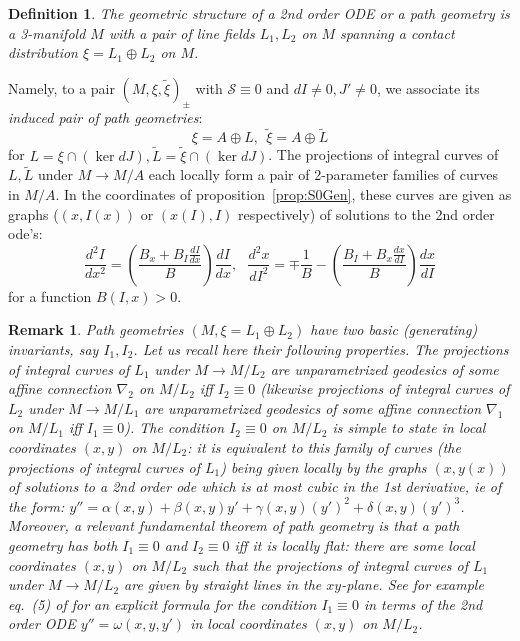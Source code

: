 \documentclass[10pt]{amsart}
\theoremstyle{definition}
\newtheorem{dfn}{Definition}
\newtheorem{rem}{Remark}
\begin{document}
   \begin{dfn}
       {\em The geometric structure of a 2nd order ODE or a {\em path geometry} is a 3-manifold $M$ with a pair of line fields $L_1, L_2$ on $M$ spanning a contact distribution $\xi = L_1\oplus L_2$ on $M$.}
   \end{dfn}


   Namely, to a pair $(M, \xi, \tilde \xi)_\pm$ with $\mathcal{S} \equiv 0$ and $dI\ne 0, J'\ne 0$, we associate its {\em induced pair of path geometries}:
   \[ \xi = A\oplus L, ~~\tilde \xi = A\oplus \tilde L \]
   for $L = \xi \cap (\ker dJ), \tilde L = \tilde \xi\cap (\ker dJ)$. The projections of integral curves of $L, \tilde L$ under $M\to M/A$ each locally form a pair of 2-parameter families of curves in $M/A$. In the coordinates of proposition~\ref{prop:S0Gen}, these curves are given as graphs ($(x, I(x))$ or $(x(I), I)$ respectively) of solutions to the 2nd order ode's:
   \begin{equation}\label{eq:PG1}
       \frac{d^2I}{dx^2} = \left(\frac{B_x + B_I\frac{dI}{dx}}{B}\right) \frac{dI}{dx}, ~~~\frac{d^2x}{dI^2} = \mp \frac{1}{B} - \left(\frac{B_I + B_x \frac{dx}{dI}}{B}\right) \frac{dx}{dI}
   \end{equation}
   for a function $B(I, x) > 0$.
   
   \begin{rem}
       {\em Path geometries $(M, \xi = L_1\oplus L_2)$ have two basic (generating) invariants, say $I_1, I_2$. Let us recall here their following properties. The projections of integral curves of $L_1$ under $M\to M/L_2$ are unparametrized geodesics of some affine connection $\nabla_2$ on $M/L_2$ iff $I_2\equiv 0$ (likewise projections of integral curves of $L_2$ under $M\to M/L_1$ are unparametrized geodesics of some affine connection $\nabla_1$ on $M/L_1$ iff $I_1\equiv 0$). The condition $I_2\equiv 0$ on $M/L_2$ is simple to state in local coordinates $(x,y)$ on $M/L_2$: it is equivalent to this family of curves (the projections of integral curves of $L_1$) being given locally by the graphs $(x, y(x))$ of solutions to a 2nd order ode which is at most {\em cubic} in the 1st derivative, ie of the form: $y'' = \alpha(x,y) + \beta(x,y) y' + \gamma(x,y)(y')^2 + \delta(x,y)(y')^3$. Moreover, a relevant fundamental theorem of path geometry is that a path geometry has both $I_1\equiv 0$ and $I_2\equiv 0$ iff it is locally {\em flat}: there are some local coordinates $(x,y)$ on $M/L_2$ such that the projections of integral curves of $L_1$ under $M\to M/L_2$ are given by straight lines in the $xy$-plane. See for example eq.~(5) of \cite{BGH} for an explicit formula for the condition $I_1\equiv 0$ in terms of the 2nd order ODE $y'' = \omega(x,y,y')$ in local coordinates $(x,y)$ on $M/L_2$.}
   \end{rem}
\end{document}
